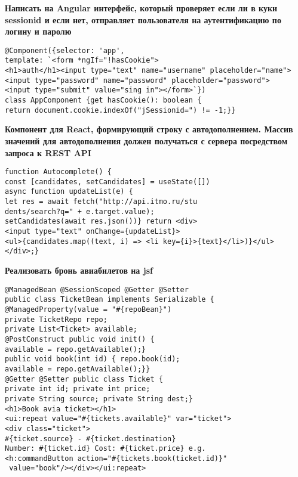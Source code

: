 \documentclass{article}
\begin{document}
\begin{minipage}[t]{0.3\textwidth}
    \textbf{Написать на Angular интерфейс, который проверяет если ли в куки sessionid и если нет, отправляет пользователя на аутентификацию по логину и паролю}
    \begin{lstlisting}[frame=single, basicstyle=\tiny\ttfamily, breaklines=true, breakatwhitespace=true, postbreak=\mbox{\textcolor{red}{$\hookrightarrow$}\space}]
@Component({selector: 'app',
template: `<form *ngIf="!hasCookie">
<h1>auth</h1><input type="text" name="username" placeholder="name">
<input type="password" name="password" placeholder="password">
<input type="submit" value="sing in"></form>`})
class AppComponent {get hasCookie(): boolean {
return document.cookie.indexOf("jSessionid=") != -1;}}
    \end{lstlisting}
\end{minipage}%
\hfill
\begin{minipage}[t]{0.3\textwidth}
    \textbf{Компонент для React, формирующий строку с автодополнением. Массив значений для автодополнения должен получаться с сервера посредством запроса к REST API}
    \begin{lstlisting}[frame=single, basicstyle=\tiny\ttfamily, breaklines=true, breakatwhitespace=true, postbreak=\mbox{\textcolor{red}{$\hookrightarrow$}\space}]
function Autocomplete() {
const [candidates, setCandidates] = useState([])
async function updateList(e) {
let res = await fetch("http://api.itmo.ru/stu
dents/search?q=" + e.target.value);
setCandidates(await res.json())} return <div>
<input type="text" onChange={updateList}>
<ul>{candidates.map((text, i) => <li key={i}>{text}</li>)}</ul></div>;}
    \end{lstlisting}
\end{minipage}%
\hfill
\begin{minipage}[t]{0.3\textwidth}
    \textbf{Реализовать бронь авиабилетов на jsf}
    \begin{lstlisting}[frame=single, basicstyle=\tiny\ttfamily, breaklines=true, breakatwhitespace=true, postbreak=\mbox{\textcolor{red}{$\hookrightarrow$}\space}]
@ManagedBean @SessionScoped @Getter @Setter
public class TicketBean implements Serializable {
@ManagedProperty(value = "#{repoBean}")
private TicketRepo repo;
private List<Ticket> available;
@PostConstruct public void init() {
available = repo.getAvailable();}
public void book(int id) { repo.book(id);
available = repo.getAvailable();}}
@Getter @Setter public class Ticket {
private int id; private int price;
private String source; private String dest;}
<h1>Book avia ticket></h1>
<ui:repeat value="#{tickets.available}" var="ticket">
<div class="ticket">
#{ticket.source} - #{ticket.destination}
Number: #{ticket.id} Cost: #{ticket.price} e.g.
<h:commandButton action="#{tickets.book(ticket.id)}"
 value="book"/></div></ui:repeat>
    \end{lstlisting}
\end{minipage}%
\\
\end{document}
